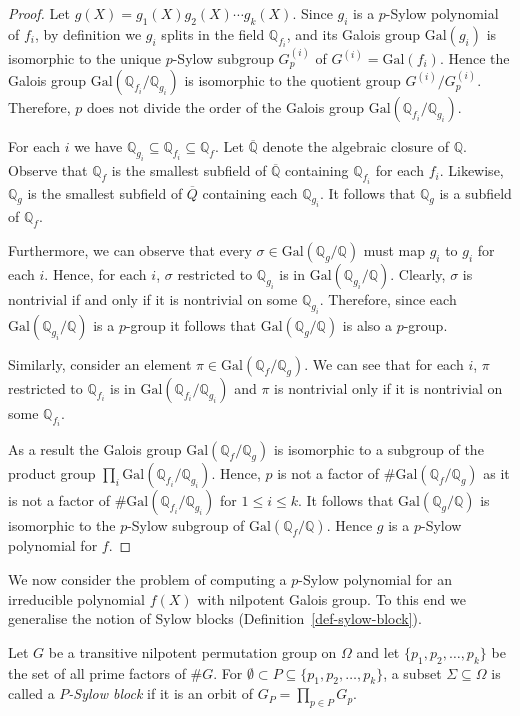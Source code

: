 \documentclass[prodmod,acmtalg]{acmsmall}
\newcommand{\Gal}[1]{{\ensuremath{\mathrm{Gal}\left(#1\right)}}}
\newcommand{\Q}{\ensuremath{\mathbb{Q}}}
\begin{document}
\begin{proof}
  Let $g(X)=g_1(X)g_2(X)\cdots g_k(X)$. Since $g_i$ is a $p$-Sylow
  polynomial of $f_i$, by definition we $g_i$ splits in the field
  $\Q_{f_i}$, and its Galois group $\Gal{g_i}$ is isomorphic to the
  unique $p$-Sylow subgroup $G^{(i)}_p$ of $G^{(i)}=\Gal{f_i}$. Hence
  the Galois group $\Gal{\Q_{f_i}/\Q_{g_i}}$ is isomorphic to the
  quotient group $G^{(i)}/G^{(i)}_p$. Therefore, $p$ does not divide
  the order of the Galois group $\Gal{\Q_{f_i}/\Q_{g_i}}$.

  For each $i$ we have $\Q_{g_i}\subseteq \Q_{f_i}\subseteq \Q_f$. Let
  $\overline{\Q}$ denote the algebraic closure of $\Q$. Observe that
  $\Q_f$ is the smallest subfield of $\overline{\Q}$ containing
  $\Q_{f_i}$ for each $f_i$. Likewise, $\Q_g$ is the smallest subfield
  of $\overline{Q}$ containing each $\Q_{g_i}$. It follows that $\Q_g$
  is a subfield of $\Q_f$.

  Furthermore, we can observe that every $\sigma\in\Gal{\Q_g/\Q}$ must
  map $g_i$ to $g_i$ for each $i$. Hence, for each $i$, $\sigma$
  restricted to $\Q_{g_i}$ is in $\Gal{\Q_{g_i}/\Q}$. Clearly,
  $\sigma$ is nontrivial if and only if it is nontrivial on some
  $\Q_{g_i}$.  Therefore, since each $\Gal{\Q_{g_i}/\Q}$ is a
  $p$-group it follows that $\Gal{\Q_g/\Q}$ is also a
  $p$-group.

  Similarly, consider an element $\pi\in\Gal{\Q_f/\Q_g}$. We can see
  that for each $i$, $\pi$ restricted to $\Q_{f_i}$ is in
  $\Gal{\Q_{f_i}/\Q_{g_i}}$ and $\pi$ is nontrivial only if it is
  nontrivial on some $\Q_{f_i}$.

  As a result the Galois group $\Gal{\Q_f/\Q_g}$ is isomorphic to a
  subgroup of the product group $\prod_i
  \Gal{\Q_{f_i}/\Q_{g_i}}$. Hence, $p$ is not a factor of $\#
  \Gal{\Q_f/\Q_g}$ as it is not a factor of $\#
  \Gal{\Q_{f_i}/\Q_{g_i}}$ for $1 \leq i \leq k$. It follows that
  $\Gal{\Q_g/\Q}$ is isomorphic to the $p$-Sylow subgroup of
  $\Gal{\Q_f/\Q}$. Hence $g$ is a $p$-Sylow polynomial for $f$.
\end{proof}

We now consider the problem of computing a $p$-Sylow polynomial for an
irreducible polynomial $f(X)$ with nilpotent Galois group. To this end
we generalise the notion of Sylow blocks
(Definition~\ref{def-sylow-block}).

\begin{definition}
  Let $G$ be a transitive nilpotent permutation group on $\Omega$ and
  let $\{p_1,p_2,\ldots,p_k\}$ be the set of all prime factors of $\#
  G$.  For $\emptyset\subset P\subseteq \{p_1,p_2,\ldots,p_k\}$, a
  subset $\Sigma\subseteq \Omega$ is called a \emph{$P$-Sylow block}
  if it is an orbit of $G_P = \prod_{p \in P}G_p$.
\end{definition}
\end{document}
